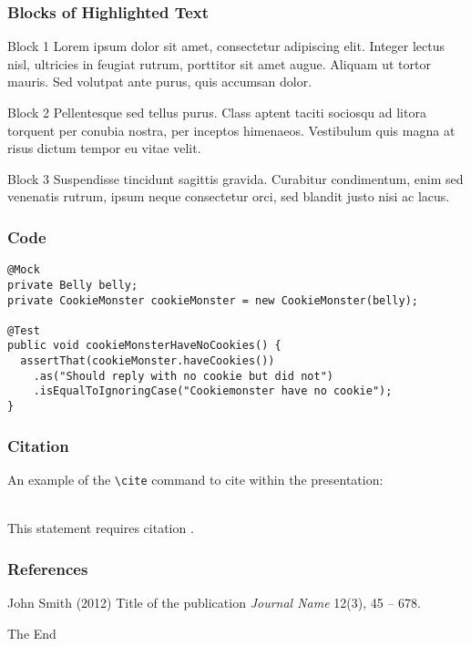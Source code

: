 \documentclass{beamer}
\begin{document}
\begin{frame}
\frametitle{Blocks of Highlighted Text}
\begin{block}{Block 1}
Lorem ipsum dolor sit amet, consectetur adipiscing elit. Integer lectus nisl, ultricies in feugiat rutrum, porttitor sit amet augue. Aliquam ut tortor mauris. Sed volutpat ante purus, quis accumsan dolor.
\end{block}

\begin{block}{Block 2}
Pellentesque sed tellus purus. Class aptent taciti sociosqu ad litora torquent per conubia nostra, per inceptos himenaeos. Vestibulum quis magna at risus dictum tempor eu vitae velit.
\end{block}

\begin{block}{Block 3}
Suspendisse tincidunt sagittis gravida. Curabitur condimentum, enim sed venenatis rutrum, ipsum neque consectetur orci, sed blandit justo nisi ac lacus.
\end{block}
\end{frame}

\begin{frame}[fragile]
\frametitle{Code}
\begin{example}[Code]
\begin{lstlisting}
@Mock
private Belly belly;
private CookieMonster cookieMonster = new CookieMonster(belly);

@Test
public void cookieMonsterHaveNoCookies() {
  assertThat(cookieMonster.haveCookies())
    .as("Should reply with no cookie but did not")
    .isEqualToIgnoringCase("Cookiemonster have no cookie");
}
\end{lstlisting}
\end{example}
\end{frame}

\begin{frame}[fragile] %
\frametitle{Citation}
An example of the \verb|\cite| command to cite within the presentation:\\~

This statement requires citation \cite{p1}.
\end{frame}


\begin{frame}
\frametitle{References}
\footnotesize{
\begin{thebibliography}{99} %
 John Smith (2012)
\newblock Title of the publication
\newblock \emph{Journal Name} 12(3), 45 -- 678.
\end{thebibliography}
}
\end{frame}


\begin{frame}
\Huge{\centerline{The End}}
\end{frame}

\end{document}
